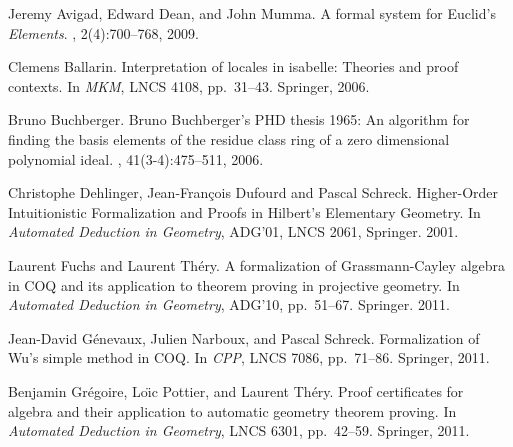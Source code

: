 















%

\begin{thebibliography}{10}

Jeremy Avigad, Edward Dean, and John Mumma.
\newblock A formal system for {E}uclid's \emph{{E}lements}.
, 2(4):700--768, 2009.

Clemens Ballarin.
\newblock Interpretation of locales in isabelle: Theories and proof contexts.
\newblock In {\em MKM}, LNCS 4108, pp.~31--43. Springer, 2006.

Bruno Buchberger.
\newblock Bruno Buchberger's PHD thesis 1965: An algorithm for finding the
  basis elements of the residue class ring of a zero dimensional polynomial
  ideal.
, 41(3-4):475--511, 2006.


Christophe Dehlinger, Jean-François Dufourd and Pascal Schreck.
\newblock Higher-Order Intuitionistic Formalization and Proofs in Hilbert’s Elementary Geometry.
\newblock In {\em Automated Deduction in Geometry}, ADG'01, LNCS 2061, Springer. 2001.



Laurent Fuchs and Laurent Th{\'e}ry.
\newblock A formalization of Grassmann-Cayley algebra in COQ and its
  application to theorem proving in projective geometry.
\newblock In {\em Automated Deduction in Geometry}, ADG'10, pp.~51--67. Springer. 2011.

Jean-David G{\'e}nevaux, Julien Narboux, and Pascal Schreck.
\newblock Formalization of Wu's simple method in COQ.
\newblock In {\em CPP}, LNCS 7086, pp.~71--86. Springer, 2011.

Benjamin Gr{\'e}goire, Lo\"{\i}c Pottier, and Laurent Th{\'e}ry.
\newblock Proof certificates for algebra and their application to automatic
  geometry theorem proving.
\newblock In {\em Automated Deduction in Geometry}, LNCS 6301, pp.~42--59. Springer, 2011.


\end{thebibliography}
